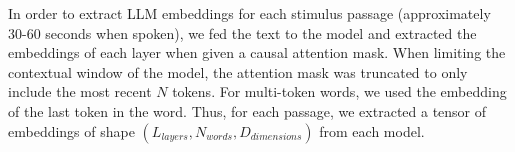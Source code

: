 
In order to extract LLM embeddings for each stimulus passage (approximately 30-60 seconds when spoken), we fed the text to the model and extracted the embeddings of each layer when given a causal attention mask. When limiting the contextual window of the model, the attention mask was truncated to only include the most recent $N$ tokens. For multi-token words, we used the embedding of the last token in the word. Thus, for each passage, we extracted a tensor of embeddings of shape $(L_{layers}, N_{words}, D_{dimensions})$ from each model.



